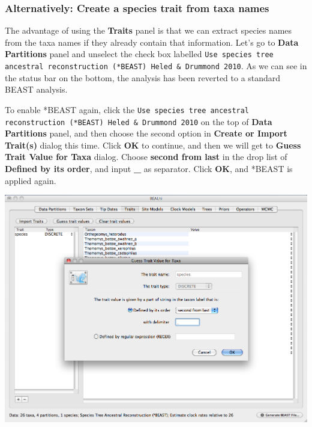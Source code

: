 \documentclass[12pt]{article}
\begin{document}
\medskip{}


\subsubsection*{Alternatively: Create a species trait from taxa names}

The advantage of using the {\bf Traits} panel is that we can extract species names from the taxa names if they already contain that information. Let's go to {\bf Data Partitions} panel and unselect the check box labelled \texttt{Use species tree ancestral reconstruction (*BEAST) Heled \& Drummond 2010}. As we can see in the status bar on the bottom, the analysis has been reverted to a standard BEAST analysis.

To enable *BEAST again, click the \texttt{Use species tree ancestral reconstruction (*BEAST) Heled \& Drummond 2010} on the top of {\bf Data Partitions} panel, and then choose the second option in {\bf Create or Import Trait(s)} dialog this time. Click \textbf{OK} to continue, and then we will get to {\bf Guess Trait Value for Taxa} dialog. Choose \textbf{second from last} in the drop list of \textbf{Defined by its order}, and input \textbf{\_} as separator. Click \textbf{OK}, and *BEAST is applied again.

\medskip{}

\includegraphics[scale=0.4]{figures/BEAUti_GuessTrait}

\medskip{}

\medskip{}
\end{document}
